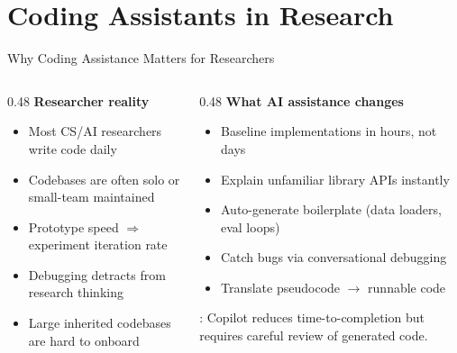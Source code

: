 
\section{Coding Assistants in Research}

\begin{frame}[shrink=10]{Why Coding Assistance Matters for Researchers}
  \begin{columns}[T, onlytextwidth]
    \begin{column}{0.48\textwidth}
      \textbf{Researcher reality}\\[0.3em]
      \begin{itemize}
        \item Most CS/AI researchers write code daily
        \item Codebases are often solo or small-team maintained
        \item Prototype speed $\Rightarrow$ experiment iteration rate
        \item Debugging detracts from research thinking
        \item Large inherited codebases are hard to onboard
      \end{itemize}
    \end{column}
    \hfill
    \begin{column}{0.48\textwidth}
      \textbf{What AI assistance changes}\\[0.3em]
      \begin{itemize}
        \item Baseline implementations in hours, not days
        \item Explain unfamiliar library APIs instantly
        \item Auto-generate boilerplate (data loaders, eval loops)
        \item Catch bugs via conversational debugging
        \item Translate pseudocode $\to$ runnable code
      \end{itemize}
      \vspace{0.5em}
      \parencite{dakhel2023copilot}: Copilot reduces time-to-completion but requires careful review of generated code.
    \end{column}
  \end{columns}
\end{frame}

